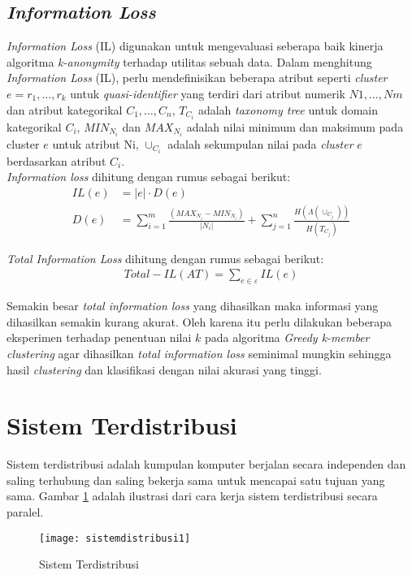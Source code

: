 \subsection{\textit{Information Loss}}
\textit{Information Loss} (IL) digunakan untuk mengevaluasi seberapa baik kinerja algoritma \textit{k-anonymity} terhadap utilitas sebuah data. Dalam menghitung \textit{Information Loss} (IL), perlu mendefinisikan beberapa atribut seperti \textit{cluster} $e = {r_1,\ldots,r_k}$  untuk \textit{quasi-identifier} yang terdiri dari atribut numerik ${N1,\ldots, Nm}$ dan atribut kategorikal ${C_1,\ldots,C_n}$, $T_{C_i}$ adalah \textit{taxonomy tree} untuk domain kategorikal $C_i$, $MIN_{N_i}$ dan $MAX_{N_i}$ adalah nilai minimum dan maksimum pada cluster $e$ untuk atribut Ni, $\cup_{C_i}$ adalah sekumpulan nilai pada \textit{cluster} $e$ berdasarkan atribut $C_i$. \\

\noindent \textit{Information loss} dihitung dengan rumus sebagai berikut:
\begin{align}
IL(e)&= |e| \cdot D(e) \\
D(e) &= \sum_{i=1}^{m} \frac{(MAX_{N_i} - MIN_{N_i})}{|N_i|} + \sum_{j=1}^{n}\frac{H(\Lambda(\cup_{C_j}))}{H(T_{C_j})}
\end{align}

\noindent \textit{Total Information Loss} dihitung dengan rumus sebagai berikut:
\begin{align}
Total-IL(AT) = \sum_{e \in \varepsilon}^{}  IL(e)
\end{align}

\noindent Semakin besar \textit{total information loss} yang dihasilkan maka informasi yang dihasilkan semakin kurang akurat. Oleh karena itu perlu dilakukan beberapa eksperimen terhadap penentuan nilai $k$ pada algoritma \textit{Greedy k-member clustering} agar dihasilkan \textit{total information loss} seminimal mungkin sehingga hasil \textit{clustering} dan klasifikasi dengan nilai akurasi yang tinggi.

\section{Sistem Terdistribusi}
Sistem terdistribusi adalah kumpulan komputer berjalan secara independen dan saling terhubung dan saling bekerja sama untuk mencapai satu tujuan yang sama. Gambar   \ref{fig:sistemdistribusi1} adalah ilustrasi dari cara kerja sistem terdistribusi secara paralel.

\begin{figure}[H]
	\centering
	\texttt{[image: sistemdistribusi1]}
	\caption{Sistem Terdistribusi}
	\label{fig:sistemdistribusi1}
\end{figure}

